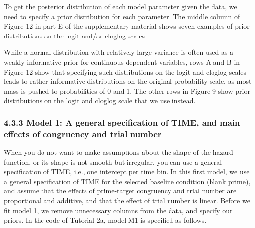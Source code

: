 \documentclass[
  man,floatsintext]{apa6}
\begin{document}
To get the posterior distribution of each model parameter given the data, we need to specify a prior distribution for each parameter. The middle column of Figure 12 in part E of the supplementary material shows seven examples of prior distributions on the logit and/or cloglog scales.

While a normal distribution with relatively large variance is often used as a weakly informative prior for continuous dependent variables, rows A and B in Figure 12 show that specifying such distributions on the logit and cloglog scales leads to rather informative distributions on the original probability scale, as most mass is pushed to probabilities of 0 and 1. The other rows in Figure 9 show prior distributions on the logit and cloglog scale that we use instead.

\subsubsection{4.3.3 Model 1: A general specification of TIME, and main effects of congruency and trial number}\label{model-1-a-general-specification-of-time-and-main-effects-of-congruency-and-trial-number}

When you do not want to make assumptions about the shape of the hazard function, or its shape is not smooth but irregular, you can use a general specification of TIME, i.e., one intercept per time bin. In this first model, we use a general specification of TIME for the selected baseline condition (blank prime), and assume that the effects of prime-target congruency and trial number are proportional and additive, and that the effect of trial number is linear.
Before we fit model 1, we remove unnecessary columns from the data, and specify our priors. In the code of Tutorial 2a, model M1 is specified as follows.

\scriptsize
\end{document}
